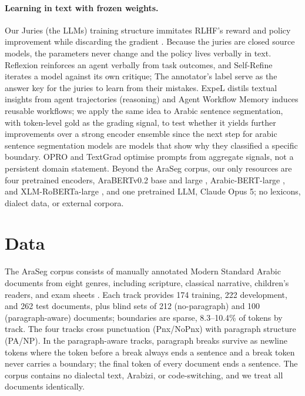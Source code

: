 \documentclass[11pt]{article}
\begin{document}
\paragraph{Learning in text with frozen weights.} Our Juries (the LLMs) training structure immitates RLHF's reward and
policy improvement while discarding the gradient
\citep{christiano2017deep, ouyang2022training}. Because the juries are closed source models, the parameters never change and the
policy lives verbally in text. Reflexion \citep{shinn2023reflexion} reinforces an agent
verbally from task outcomes, and Self-Refine \citep{madaan2023selfrefine} iterates a
model against its own critique; The annotator's label serve as the answer key for the juries to learn from their mistakes. ExpeL \citep{zhao2024expel} distils textual insights from agent trajectories (reasoning) and Agent Workflow Memory \citep{wang2024awm} induces reusable workflows; we apply the same idea to Arabic sentence segmentation, with token-level gold as the grading signal, to test whether it yields further improvements over a strong encoder ensemble since the next step for arabic sentence segmentation models are models that show why they classified a specific boundary. OPRO
\citep{yang2024optimizers} and TextGrad \citep{yuksekgonul2024textgrad} optimise
prompts from aggregate signals, not a persistent domain statement. Beyond the AraSeg
corpus, our only resources are four pretrained encoders, AraBERTv0.2 base and large
\citep{antoun-etal-2020-arabert}, Arabic-BERT-large \citep{safaya-etal-2020-kuisail},
and XLM-RoBERTa-large \citep{conneau-etal-2020-unsupervised}, and one pretrained LLM,
Claude Opus 5; no lexicons, dialect data, or external corpora.
\section{Data}
\label{sec:data}
The AraSeg corpus consists of manually annotated Modern Standard Arabic documents from
eight genres, including scripture, classical narrative, children's readers, and exam
sheets \citep{elkholy2026arabicsentencesegmentationgenres}. Each track provides 174
training, 222 development, and 262 test documents, plus blind sets of 212
(no-paragraph) and 100 (paragraph-aware) documents; boundaries are sparse,
8.3--10.4\% of tokens by track. The four tracks cross punctuation (Pnx/NoPnx) with
paragraph structure (PA/NP). In the paragraph-aware tracks, paragraph breaks survive
as newline tokens where the token before a break always ends a sentence and a break token never carries a boundary; the final token of every document ends a sentence. The corpus contains no dialectal text, Arabizi, or code-switching, and we treat all
documents identically.
\end{document}
